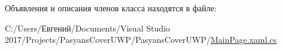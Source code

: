 Объявления и описания членов класса находятся в файле\+:\begin{DoxyCompactItemize}
\item 
C\+:/\+Users/Евгений/\+Documents/\+Visual Studio 2017/\+Projects/\+Pasyans\+Cover\+U\+W\+P/\+Pasyans\+Cover\+U\+W\+P/\hyperlink{_main_page_8xaml_8cs}{Main\+Page.\+xaml.\+cs}\end{DoxyCompactItemize}
